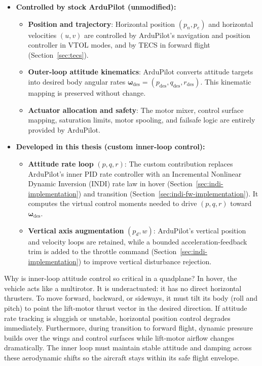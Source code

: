 \documentclass{article}
\begin{document}
\begin{itemize}
    \item \textbf{Controlled by stock ArduPilot (unmodified):}
    \begin{itemize}
        \item \textbf{Position and trajectory}: Horizontal position $(p_n, p_e)$ and horizontal velocities $(u, v)$ are controlled by ArduPilot's navigation and position controller in VTOL modes, and by TECS in forward flight (Section~\ref{sec:tecs}).
        \item \textbf{Outer-loop attitude kinematics}: ArduPilot converts attitude targets into desired body angular rates $\boldsymbol{\omega}_{\mathrm{des}} = (p_{\mathrm{des}}, q_{\mathrm{des}}, r_{\mathrm{des}})$. This kinematic mapping is preserved without change.
        \item \textbf{Actuator allocation and safety}: The motor mixer, control surface mapping, saturation limits, motor spooling, and failsafe logic are entirely provided by ArduPilot.
    \end{itemize}

    \item \textbf{Developed in this thesis (custom inner-loop control):}
    \begin{itemize}
        \item \textbf{Attitude rate loop} $(p, q, r)$: The custom contribution replaces ArduPilot's inner PID rate controller with an Incremental Nonlinear Dynamic Inversion (INDI) rate law in hover (Section~\ref{sec:indi-implementation}) and transition (Section~\ref{sec:indi-fw-implementation}). It computes the virtual control moments needed to drive $(p, q, r)$ toward $\boldsymbol{\omega}_{\mathrm{des}}$.
        \item \textbf{Vertical axis augmentation} $(p_d, w)$: ArduPilot's vertical position and velocity loops are retained, while a bounded acceleration-feedback trim is added to the throttle command (Section~\ref{sec:indi-implementation}) to improve vertical disturbance rejection.
    \end{itemize}
\end{itemize}

Why is inner-loop attitude control so critical in a quadplane? In hover, the vehicle acts like a multirotor. It is underactuated: it has no direct horizontal thrusters. To move forward, backward, or sideways, it must tilt its body (roll and pitch) to point the lift-motor thrust vector in the desired direction. If attitude rate tracking is sluggish or unstable, horizontal position control degrades immediately. Furthermore, during transition to forward flight, dynamic pressure builds over the wings and control surfaces while lift-motor airflow changes dramatically. The inner loop must maintain stable attitude and damping across these aerodynamic shifts so the aircraft stays within its safe flight envelope.
\end{document}
